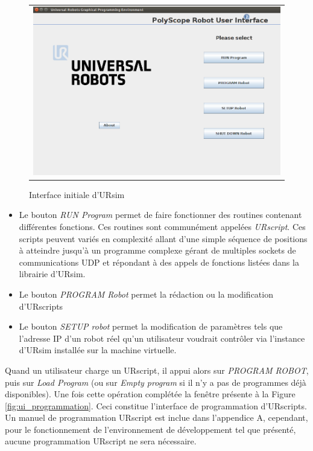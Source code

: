\documentclass[root.tex]{subfiles}
\begin{document}
\begin{figure}
 \begin{center}
  \begin{tabular}{c}
    \includegraphics[trim=0cm 0cm 0cm 0cm, scale=0.4]{screenshots_tuto_ursim/interface_init.png}
  \end{tabular}
 \end{center}
\caption{Interface initiale d'URsim}
 \label{fig:ui_start}
\end{figure}

\begin{itemize}
\item Le bouton \textit{RUN Program} permet de faire fonctionner des routines contenant différentes fonctions. Ces routines sont communément appelées \textit{URscript}. Ces scripts peuvent variés en complexité allant d'une simple séquence de positions à atteindre jusqu'à un programme complexe gérant de multiples sockets de communications UDP et répondant à des appels de fonctions listées dans la librairie d'URsim.
\item Le bouton \textit{PROGRAM Robot} permet la rédaction ou la modification d'URscripts
\item Le bouton \textit{SETUP robot} permet la modification de paramètres tels que l'adresse IP d'un robot réel qu'un utilisateur voudrait contrôler via l'instance d'URsim installée sur la machine virtuelle.
\end{itemize}

Quand un utilisateur charge un URscript, il appui alors sur \textit{PROGRAM ROBOT}, puis sur \textit{Load Program} (ou sur \textit{Empty program} si il n'y a pas de programmes déjà disponibles). Une fois cette opération complétée la fenêtre présente à la Figure \ref{fig:ui_programmation}. Ceci constitue l'interface de programmation d'URscripts. Un manuel de programmation URscript est inclue dans l'appendice A, cependant, pour le fonctionnement de l'environnement de développement tel que présenté, aucune programmation URscript ne sera nécessaire.
\end{document}
